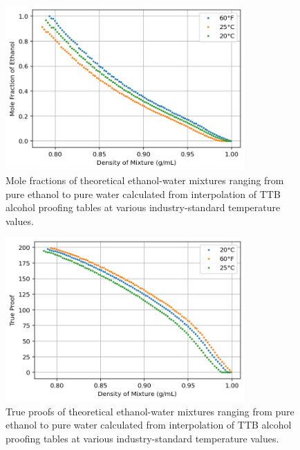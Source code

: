 \documentclass[lettersize,journal]{IEEEtran}
\begin{document}
	
	\begin{figure}[!t]
		\centering
		\includegraphics[width=3.6in]{fig1}
		\caption{ Mole fractions of theoretical ethanol-water mixtures ranging from pure ethanol to pure water calculated from interpolation of TTB alcohol proofing tables at various industry-standard temperature values. }
		\label{fig_1}
	\end{figure}
	\begin{figure}[!t]
		\centering
		\includegraphics[width=3.6in]{fig2}
		\caption{{ True proofs of theoretical ethanol-water mixtures ranging from pure ethanol to pure water calculated from interpolation of TTB alcohol proofing tables at various industry-standard temperature values. } }
		\label{fig_2}
	\end{figure}
\end{document}
